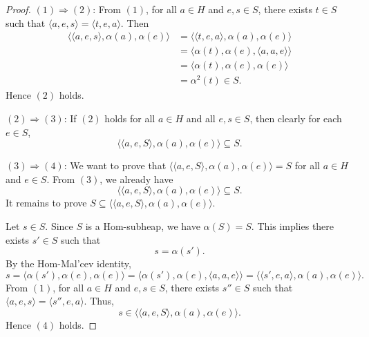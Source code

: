 \documentclass[10pt,a4paper]{amsart}
\begin{document}
\begin{proof}
$(1) \Rightarrow (2)$:  
From $(1)$, for all $a \in H$ and $e, s \in S$, there exists $t \in S$ such that $\langle a, e, s \rangle = \langle t, e, a \rangle$. Then
\begin{align*}
\langle \langle a, e, s \rangle, \alpha(a), \alpha(e) \rangle
&= \langle \langle t, e, a \rangle, \alpha(a), \alpha(e) \rangle \\
&= \langle \alpha(t), \alpha(e), \langle a, a, e \rangle \rangle \\
&= \langle \alpha(t), \alpha(e), \alpha(e) \rangle \\
&= \alpha^{2}(t) \in S.
\end{align*}
Hence $(2)$ holds.

\vspace{0.3em}
$(2) \Rightarrow (3)$:  
If $(2)$ holds for all $a \in H$ and all $e, s \in S$, then clearly for each $e \in S$,
\[
\langle \langle a, e, S \rangle, \alpha(a), \alpha(e) \rangle \subseteq S.
\]

\vspace{0.3em}
$(3) \Rightarrow (4)$:  
We want to prove that $\langle \langle a, e, S \rangle, \alpha(a), \alpha(e) \rangle = S$ for all $a \in H$ and $e \in S$.  
From $(3)$, we already have
\[
\langle \langle a, e, S \rangle, \alpha(a), \alpha(e) \rangle \subseteq S.
\]
It remains to prove $S \subseteq \langle \langle a, e, S \rangle, \alpha(a), \alpha(e) \rangle$.

Let $s \in S$. Since $S$ is a Hom-subheap, we have $\alpha(S)=S$. This implies there exists $s' \in S$ such that
\[
s = \alpha(s').
\]
By the Hom-Mal'cev identity,
\[
s = \langle \alpha(s'), \alpha(e), \alpha(e) \rangle
  = \langle \alpha(s'), \alpha(e), \langle a, a, e \rangle \rangle
  = \langle \langle s', e, a \rangle, \alpha(a), \alpha(e) \rangle.
\]
From $(1)$, for all $a \in H$ and $e, s \in S$, there exists $s'' \in S$ such that $\langle a, e, s \rangle = \langle s'', e, a \rangle$. Thus,
\[
s \in \langle \langle a, e, S \rangle, \alpha(a), \alpha(e) \rangle.
\]
Hence $(4)$ holds.


\end{proof}
\end{document}
